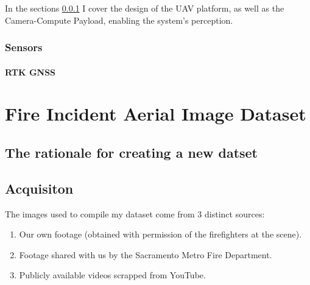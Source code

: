   In the sections \ref{sec:sensors} I cover the design of the UAV platform, as well as the Camera-Compute Payload, enabling the system's perception.

  
  
  \subsubsection{Sensors}\label{sec:sensors}


  \paragraph{RTK GNSS}


  




\section{Fire Incident Aerial Image Dataset}\label{sec:dataset}

  \subsection{The rationale for creating a new datset}


  \subsection{Acquisiton}

  The images used to compile my dataset come from 3 distinct sources:
  \begin{enumerate}
    \item Our own footage (obtained with permission of the firefighters at the scene).
    \item Footage shared with us by the Sacramento Metro Fire Department.
    \item Publicly available videos scrapped from YouTube.
  \end{enumerate}

